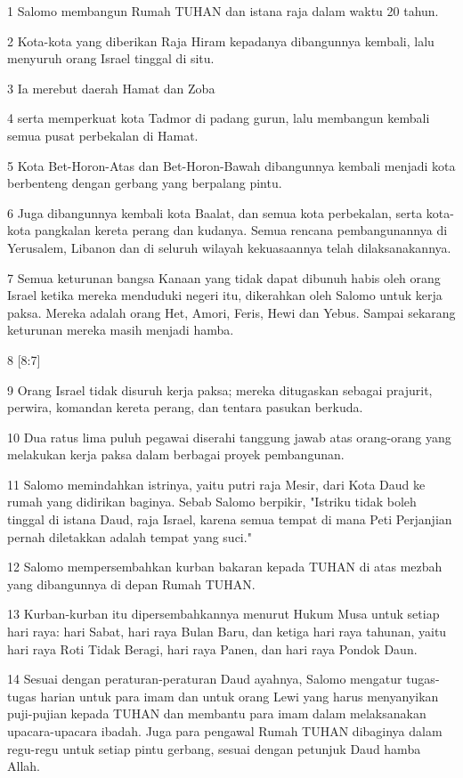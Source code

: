 \par 1 Salomo membangun Rumah TUHAN dan istana raja dalam waktu 20 tahun.
\par 2 Kota-kota yang diberikan Raja Hiram kepadanya dibangunnya kembali, lalu menyuruh orang Israel tinggal di situ.
\par 3 Ia merebut daerah Hamat dan Zoba
\par 4 serta memperkuat kota Tadmor di padang gurun, lalu membangun kembali semua pusat perbekalan di Hamat.
\par 5 Kota Bet-Horon-Atas dan Bet-Horon-Bawah dibangunnya kembali menjadi kota berbenteng dengan gerbang yang berpalang pintu.
\par 6 Juga dibangunnya kembali kota Baalat, dan semua kota perbekalan, serta kota-kota pangkalan kereta perang dan kudanya. Semua rencana pembangunannya di Yerusalem, Libanon dan di seluruh wilayah kekuasaannya telah dilaksanakannya.
\par 7 Semua keturunan bangsa Kanaan yang tidak dapat dibunuh habis oleh orang Israel ketika mereka menduduki negeri itu, dikerahkan oleh Salomo untuk kerja paksa. Mereka adalah orang Het, Amori, Feris, Hewi dan Yebus. Sampai sekarang keturunan mereka masih menjadi hamba.
\par 8 [8:7]
\par 9 Orang Israel tidak disuruh kerja paksa; mereka ditugaskan sebagai prajurit, perwira, komandan kereta perang, dan tentara pasukan berkuda.
\par 10 Dua ratus lima puluh pegawai diserahi tanggung jawab atas orang-orang yang melakukan kerja paksa dalam berbagai proyek pembangunan.
\par 11 Salomo memindahkan istrinya, yaitu putri raja Mesir, dari Kota Daud ke rumah yang didirikan baginya. Sebab Salomo berpikir, "Istriku tidak boleh tinggal di istana Daud, raja Israel, karena semua tempat di mana Peti Perjanjian pernah diletakkan adalah tempat yang suci."
\par 12 Salomo mempersembahkan kurban bakaran kepada TUHAN di atas mezbah yang dibangunnya di depan Rumah TUHAN.
\par 13 Kurban-kurban itu dipersembahkannya menurut Hukum Musa untuk setiap hari raya: hari Sabat, hari raya Bulan Baru, dan ketiga hari raya tahunan, yaitu hari raya Roti Tidak Beragi, hari raya Panen, dan hari raya Pondok Daun.
\par 14 Sesuai dengan peraturan-peraturan Daud ayahnya, Salomo mengatur tugas-tugas harian untuk para imam dan untuk orang Lewi yang harus menyanyikan puji-pujian kepada TUHAN dan membantu para imam dalam melaksanakan upacara-upacara ibadah. Juga para pengawal Rumah TUHAN dibaginya dalam regu-regu untuk setiap pintu gerbang, sesuai dengan petunjuk Daud hamba Allah.
